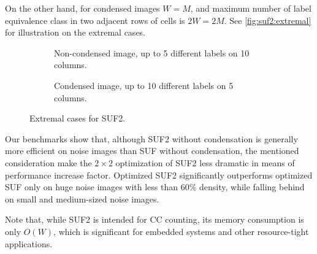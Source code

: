 \documentclass[hidelinks]{llncs}
\newcommand{\texten}[1]{#1}
\newcommand{\textru}[1]{}
\begin{document}
\texten{
On the other hand, for condensed images $W=M$, and maximum number of label equivalence
class in two adjacent rows of cells is $2W=2M$.
See \autoref{fig:suf2:extremal} for illustration on the extremal cases.
}\textru{
С другой стороны, для сжатых изображений $W=M$, и максимальное число классов
эквивалентности равно $2W=2M$. Смотри примеры на \autoref{fig:suf2:extremal}.
}

\begin{figure}
  \centering
  \begin{subfigure}{0.475\linewidth}
    \centering
    \caption{Non-condensed image, up to 5 different labels on 10 columns.}
  \end{subfigure}
  \quad
  \begin{subfigure}{0.475\linewidth}
    \centering
    \caption{Condensed image, up to 10 different labels on 5 columns.}
  \end{subfigure}
  \caption{Extremal cases for SUF2.}
  \label{fig:suf2:extremal}
\end{figure}

\texten{
Our benchmarks show that, although SUF2 without condensation is generally more
efficient on noise images than SUF without condensation, the mentioned
consideration make the $2 \times 2$ optimization
of SUF2 less dramatic in means of performance increase factor.
Optimized SUF2 significantly outperforms optimized SUF only on
huge noise images with less than 60\% density, while falling behind on
small and medium-sized noise images.
}\textru{
Проведённые эксперименты показывают, что хотя SUF2 без сжатия в целом более
эффективен, чем SUF без сжатия, приведённая оценка делает относительное
ускорение SUF2 со сжатием не таким значительным.
}

\texten{
Note that, while SUF2 is intended for CC counting, its memory
consumption is only $O(W)$, which is significant for embedded systems and
other resource-tight applications.
}\textru{
Отметим, что SUF2 решает задачу подсчёта СК, используя всего $O(W)$
дополнительной памяти.
}
\end{document}
